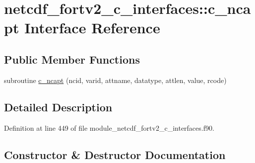 \hypertarget{interfacenetcdf__fortv2__c__interfaces_1_1c__ncapt}{}\section{netcdf\+\_\+fortv2\+\_\+c\+\_\+interfaces\+:\+:c\+\_\+ncapt Interface Reference}
\label{interfacenetcdf__fortv2__c__interfaces_1_1c__ncapt}
\subsection*{Public Member Functions}
\begin{DoxyCompactItemize}
\item 
subroutine \hyperlink{interfacenetcdf__fortv2__c__interfaces_1_1c__ncapt_ab57568a6b6442d4d36ba4a847006cfa9}{c\+\_\+ncapt} (ncid, varid, attname, datatype, attlen, value, rcode)
\end{DoxyCompactItemize}


\subsection{Detailed Description}


Definition at line 449 of file module\+\_\+netcdf\+\_\+fortv2\+\_\+c\+\_\+interfaces.\+f90.



\subsection{Constructor \& Destructor Documentation}
\mbox{\label{interfacenetcdf__fortv2__c__interfaces_1_1c__ncapt_ab57568a6b6442d4d36ba4a847006cfa9}} 
